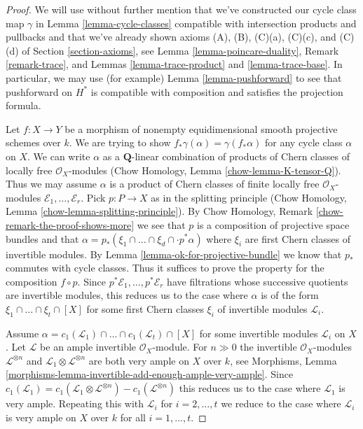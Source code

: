 \begin{proof}
We will use without further mention that we've constructed our
cycle class map $\gamma$ in Lemma \ref{lemma-cycle-classes}
compatible with intersection products and pullbacks and that
we've already shown axioms
(A), (B), (C)(a), (C)(c), and (C)(d) of Section \ref{section-axioms}, see
Lemma \ref{lemma-poincare-duality},
Remark \ref{remark-trace}, and
Lemmas \ref{lemma-trace-product} and \ref{lemma-trace-base}.
In particular, we may use (for example) Lemma \ref{lemma-pushforward}
to see that pushforward on $H^*$ is compatible with composition
and satisfies the projection formula.

\medskip\noindent
Let $f : X \to Y$ be a morphism of nonempty
equidimensional smooth projective schemes over $k$.
We are trying to show $f_*\gamma(\alpha) = \gamma(f_*\alpha)$
for any cycle class $\alpha$ on $X$.
We can write $\alpha$ as a $\mathbf{Q}$-linear combination of products of
Chern classes of locally free $\mathcal{O}_X$-modules
(Chow Homology, Lemma \ref{chow-lemma-K-tensor-Q}).
Thus we may assume $\alpha$ is a product of Chern classes of
finite locally free $\mathcal{O}_X$-modules
$\mathcal{E}_1, \ldots, \mathcal{E}_r$.
Pick $p : P \to X$ as in the splitting principle
(Chow Homology, Lemma \ref{chow-lemma-splitting-principle}).
By Chow Homology, Remark \ref{chow-remark-the-proof-shows-more}
we see that $p$ is a composition of projective space bundles and
that $\alpha = p_*(\xi_1 \cap \ldots \cap \xi_d \cap \cdot p^*\alpha)$
where $\xi_i$ are first Chern classes of invertible modules.
By Lemma \ref{lemma-ok-for-projective-bundle}
we know that $p_*$ commutes with cycle classes.
Thus it suffices to prove the property for the composition
$f \circ p$. Since $p^*\mathcal{E}_1, \ldots, p^*\mathcal{E}_r$
have filtrations whose successive quotients are invertible
modules, this reduces us to the case where $\alpha$ is
of the form $\xi_1 \cap \ldots \cap \xi_t \cap [X]$
for some first Chern classes $\xi_i$ of invertible modules $\mathcal{L}_i$.

\medskip\noindent
Assume
$\alpha = c_1(\mathcal{L}_1) \cap \ldots \cap c_1(\mathcal{L}_t) \cap [X]$
for some invertible modules $\mathcal{L}_i$ on $X$.
Let $\mathcal{L}$ be an ample invertible $\mathcal{O}_X$-module.
For $n \gg 0$ the invertible $\mathcal{O}_X$-modules
$\mathcal{L}^{\otimes n}$ and
$\mathcal{L}_1 \otimes \mathcal{L}^{\otimes n}$ are both
very ample on $X$ over $k$, see
Morphisms, Lemma \ref{morphisms-lemma-invertible-add-enough-ample-very-ample}.
Since $c_1(\mathcal{L}_1) = c_1(\mathcal{L}_1 \otimes \mathcal{L}^{\otimes n})
- c_1(\mathcal{L}^{\otimes n})$ this reduces us to the case where
$\mathcal{L}_1$ is very ample. Repeating this with $\mathcal{L}_i$
for $i = 2, \ldots, t$ we reduce to the case where $\mathcal{L}_i$
is very ample on $X$ over $k$ for all $i = 1, \ldots, t$.


\end{proof}
